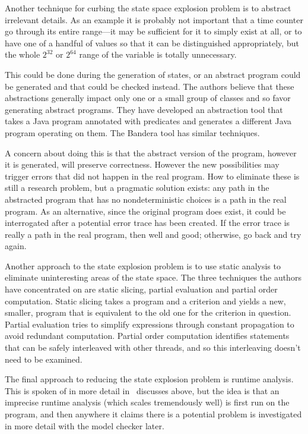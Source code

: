 \documentclass{article}
\begin{document}
\begin{multicols}{2}
Another technique for curbing the state space explosion problem is to
abstract irrelevant details.  As an example it is probably not
important that a time counter go through its entire range---it may be
sufficient for it to simply exist at all, or to have one of a handful
of values so that it can be distinguished appropriately, but the whole
$2^{32}$ or $2^{64}$ range of the variable is totally unnecessary.

This could be done during the generation of states, or an abstract
program could be generated and that could be checked instead.  The
authors believe that these abstractions generally impact only one or a
small group of classes and so favor generating abstract programs.
They have developed an abstraction tool that takes a Java program
annotated with predicates and generates a different Java program
operating on them.  The Bandera tool has similar techniques.

A concern about doing this is that the abstract version of the
program, however it is generated, will preserve correctness.  However
the new possibilities may trigger errors that did not happen in the
real program.  How to eliminate these is still a research problem, but
a pragmatic solution exists: any path in the abstracted program that
has no nondeterministic choices is a path in the real program.  As an
alternative, since the original program does exist, it could be
interrogated after a potential error trace has been created.  If the
error trace is really a path in the real program, then well and good;
otherwise, go back and try again.

Another approach to the state explosion problem is to use static
analysis to eliminate uninteresting areas of the state space.  The
three techniques the authors have concentrated on are static slicing,
partial evaluation and partial order computation.  Static slicing
takes a program and a criterion and yields a new, smaller, program
that is equivalent to the old one for the criterion in question.
Partial evaluation tries to simplify expressions through constant
propagation to avoid redundant computation.  Partial order computation
identifies statements that can be safely interleaved with other
threads, and so this interleaving doesn't need to be examined.

The final approach to reducing the state explosion problem is runtime
analysis.  This is spoken of in more detail in~\cite{havelund00using}
discusses above, but the idea is that an imprecise runtime analysis
(which scales tremendously well) is first run on the program, and then
anywhere it claims there is a potential problem is investigated in
more detail with the model checker later.


\end{multicols}
\end{document}
